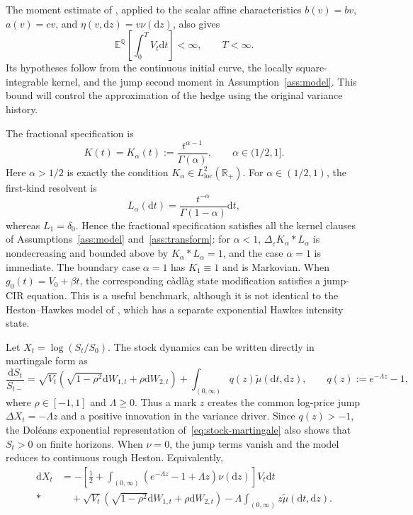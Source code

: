 \documentclass[11pt]{article}
\theoremstyle{definition}
\theoremstyle{remark}
\newcommand{\R}{\mathbb{R}}
\newcommand{\E}{\mathbb{E}}
\newcommand{\Q}{\mathbb{Q}}
\newcommand{\1}{\mathbf{1}}
\newcommand{\mut}{\widetilde\mu}
\newcommand{\dd}{\mathrm{d}}
\begin{document}
The moment estimate of \citet[Lemma~1]{bondi2024affine}, applied to the
scalar affine characteristics $b(v)=bv$, $a(v)=cv$, and
$\eta(v,\dd z)=v\nu(\dd z)$, also gives
\begin{equation}
\label{eq:original-integrated-first-moment}
 \E^\Q\!\left[\int_0^T V_t\dd t\right]<\infty,
 \qquad T<\infty.
\end{equation}
Its hypotheses follow from the continuous initial curve, the locally
square-integrable kernel, and the jump second moment in
Assumption~\ref{ass:model}. This bound will control the approximation of
the hedge using the original variance history.

The fractional specification is
\begin{equation}
\label{eq:fractional-kernel}
 K(t)=K_\alpha(t):=\frac{t^{\alpha-1}}{\Gamma(\alpha)},
 \qquad \alpha\in(1/2,1].
\end{equation}
Here $\alpha>1/2$ is exactly the condition $K_\alpha\in
L^2_{\mathrm{loc}}(\R_+)$. For $\alpha\in(1/2,1)$, the first-kind resolvent is
\[
 L_\alpha(\dd t)=\frac{t^{-\alpha}}{\Gamma(1-\alpha)}\dd t,
\]
whereas $L_1=\delta_0$. Hence the fractional specification satisfies all the
kernel clauses of Assumptions~\ref{ass:model} and~\ref{ass:transform}: for
$\alpha<1$, $\Delta_\varepsilon K_\alpha*L_\alpha$ is nondecreasing and
bounded above by $K_\alpha*L_\alpha=1$, and the case $\alpha=1$ is immediate.
The boundary case $\alpha=1$ has $K_1\equiv1$ and is Markovian. When
$g_0(t)=V_0+\beta t$, the corresponding c\`adl\`ag state modification
satisfies a jump-CIR equation. This is a useful benchmark, although it is not
identical to the Heston--Hawkes model of \citet{banos2024}, which has a
separate exponential Hawkes intensity state.

Let $X_t=\log(S_t/S_0)$. The stock dynamics can be written directly in
martingale form as
\begin{equation}
\label{eq:stock-martingale}
 \frac{\dd S_t}{S_{t-}}
 =\sqrt{V_t}\left(\sqrt{1-\rho^2}\dd W_{1,t}+\rho\dd W_{2,t}\right)
  +\int_{(0,\infty)}q(z)\mut(\dd t,\dd z),
 \qquad q(z):=e^{-\Lambda z}-1,
\end{equation}
where $\rho\in[-1,1]$ and $\Lambda\ge0$. Thus a mark $z$ creates the common
log-price jump $\Delta X_t=-\Lambda z$ and a positive innovation in the
variance driver. Since $q(z)>-1$, the Dol\'eans exponential representation
of~\eqref{eq:stock-martingale} also shows that $S_t>0$ on finite horizons.
When $\nu=0$, the jump terms vanish and the model reduces to continuous rough
Heston.
Equivalently,
\begin{align}
 \dd X_t
 &= -\left[\frac12+\int_{(0,\infty)}
       \left(e^{-\Lambda z}-1+\Lambda z\right)\nu(\dd z)\right]V_t\dd t
 \nonumber\\*
 &\quad+\sqrt{V_t}\left(\sqrt{1-\rho^2}\dd W_{1,t}
                   +\rho\dd W_{2,t}\right)
       -\Lambda\int_{(0,\infty)}z\mut(\dd t,\dd z).
 \label{eq:log-price}
\end{align}
\end{document}
